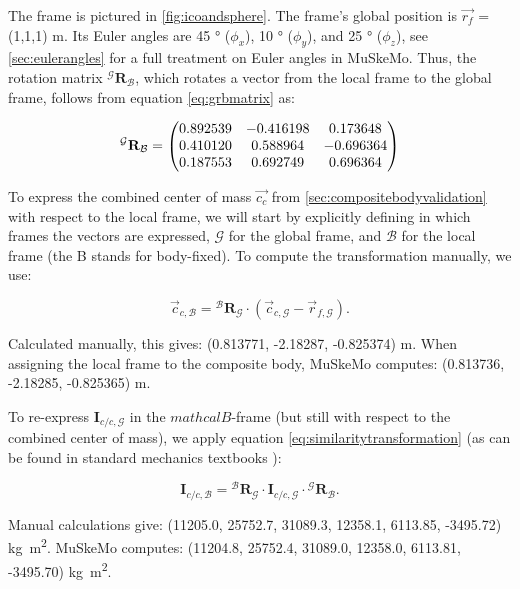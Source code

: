 \documentclass{article}
\begin{document}
The frame is pictured in \ref{fig:icoandsphere}. The frame's global position is \(\vec{r_f}\) = (1,1,1) \si{m}. Its Euler angles are 45 \si{\degree} (\( \phi_x \)), 10 \si{\degree} (\( \phi_y \)), and 25 \si{\degree} (\( \phi_z \)), see \ref{sec:eulerangles} for a full treatment on Euler angles in MuSkeMo. Thus, the rotation matrix \({}^{\mathcal{G}} \mathbf{R}_{\mathcal{B}}\), which rotates a vector from the local frame to the global frame, follows from equation \ref{eq:grbmatrix} as:


\begin{equation}
    {}^{\mathcal{G}} \mathbf{R}_{\mathcal{B}} =
    \mqty(
    0.892539 & -0.416198 & 0.173648 \\
    0.410120 & 0.588964 & -0.696364 \\
    0.187553 & 0.692749 & 0.696364
    )
\end{equation}

To express the combined center of mass \(\vec{c_{c}}\) from \ref{sec:compositebodyvalidation} with respect to the local frame, we will start by explicitly defining in which frames the vectors are expressed, \(\mathcal{G}\) for the global frame, and \(\mathcal{B}\) for the local frame (the B stands for body-fixed). To compute the transformation manually, we use:

\begin{equation}
\vec{c}_{c,\mathcal{B}} = {}^{\mathcal{B}} \mathbf{R}_{\mathcal{G}} \cdot (\vec{c}_{c,\mathcal{G}} - \vec{r}_{f,\mathcal{G}}).
\end{equation}

Calculated manually, this gives: (0.813771, -2.18287, -0.825374) \si{m}. When assigning the local frame to the composite body, MuSkeMo computes: (0.813736, -2.18285, -0.825365) \si{m}. 

To re-express \(\mathbf{I}_{c/c,{\mathcal{G}}}\) in the \(mathcal{B}\)-frame (but still with respect to the combined center of mass), we apply equation \ref{eq:similaritytransformation} (as can be found in standard mechanics textbooks \cite{valleryAdvancedDynamics2019}):

\begin{equation}
    \mathbf{I}_{c/c,{\mathcal{B}}} = {}^{\mathcal{B}} \mathbf{R}_{\mathcal{G}} \cdot \mathbf{I}_{c/c,{\mathcal{G}}} \cdot {}^{\mathcal{G}} \mathbf{R}_{\mathcal{B}}.
\end{equation}

Manual calculations give: (11205.0, 25752.7, 31089.3, 12358.1, 6113.85, -3495.72) \si{kg m^2}. MuSkeMo computes: (11204.8, 25752.4, 31089.0, 12358.0, 6113.81, -3495.70) \si{kg m^2}.
\end{document}
